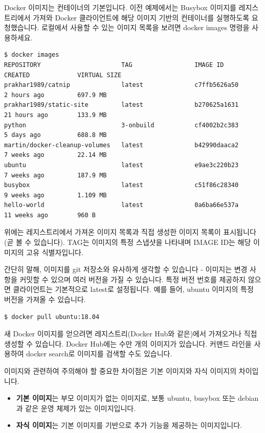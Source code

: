 Docker 이미지는 컨테이너의 기본입니다. 이전 예제에서는 Busybox 이미지를 레지스트리에서 가져와 Docker 클라이언트에 해당 이미지 기반의 컨테이너를 실행하도록 요청했습니다. 로컬에서 사용할 수 있는 이미지 목록을 보려면 docker images 명령을 사용하세요.
\begin{lstlisting}[language=Shell]
$ docker images
REPOSITORY                      TAG                 IMAGE ID            CREATED             VIRTUAL SIZE
prakhar1989/catnip              latest              c7ffb5626a50        2 hours ago         697.9 MB
prakhar1989/static-site         latest              b270625a1631        21 hours ago        133.9 MB
python                          3-onbuild           cf4002b2c383        5 days ago          688.8 MB
martin/docker-cleanup-volumes   latest              b42990daaca2        7 weeks ago         22.14 MB
ubuntu                          latest              e9ae3c220b23        7 weeks ago         187.9 MB
busybox                         latest              c51f86c28340        9 weeks ago         1.109 MB
hello-world                     latest              0a6ba66e537a        11 weeks ago        960 B
\end{lstlisting}

위에는 레지스트리에서 가져온 이미지 목록과 직접 생성한 이미지 목록이 표시됩니다(곧 볼 수 있습니다). TAG는 이미지의 특정 스냅샷을 나타내며 IMAGE ID는 해당 이미지의 고유 식별자입니다.

간단히 말해, 이미지를 git 저장소와 유사하게 생각할 수 있습니다 - 이미지는 변경 사항을 커밋할 수 있으며 여러 버전을 가질 수 있습니다. 특정 버전 번호를 제공하지 않으면 클라이언트는 기본적으로 latest로 설정됩니다. 예를 들어, ubuntu 이미지의 특정 버전을 가져올 수 있습니다.
\begin{lstlisting}[language=Shell]
$ docker pull ubuntu:18.04
\end{lstlisting}

새 Docker 이미지를 얻으려면 레지스트리(Docker Hub와 같은)에서 가져오거나 직접 생성할 수 있습니다. Docker Hub에는 수만 개의 이미지가 있습니다. 커맨드 라인을 사용하여 docker search로 이미지를 검색할 수도 있습니다.

이미지와 관련하여 주의해야 할 중요한 차이점은 기본 이미지와 자식 이미지의 차이입니다.
\begin{itemize}
    \item \textbf{기본 이미지}는 부모 이미지가 없는 이미지로, 보통 ubuntu, busybox 또는 debian과 같은 운영 체제가 있는 이미지입니다.
    \item \textbf{자식 이미지}는 기본 이미지를 기반으로 추가 기능을 제공하는 이미지입니다.
\end{itemize}

